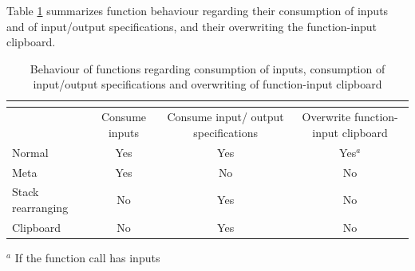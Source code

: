 \documentclass[12pt]{article}
\newcommand{\esptab}{\multicolumn{1}{c}{} \\[-.3cm]} %
\begin{document}
Table \ref{tab: function consumption} summarizes function behaviour regarding their consumption of inputs and of input/output specifications, and their overwriting the function-input clipboard.
\begin{table}
\centering
\caption{Behaviour of functions regarding consumption of inputs, consumption of input/output specifications and overwriting of function-input clipboard}
\label{tab: function consumption}
\begin{tabular}{|l|c|c|c|}
\esptab
\hline
\multicolumn{1}{|p{3cm}}{ } & \multicolumn{1}{|p{3cm}}{Consume inputs} & \multicolumn{1}{|p{3cm}|}{Consume input/ output specifications} & \multicolumn{1}{|p{3cm}|}{Overwrite function-input clipboard} \\ \hline\hline
Normal & Yes & Yes & Yes$^a$ \\ \hline
Meta & Yes & No & No\\ \hline
Stack rearranging & No & Yes & No \\ \hline
Clipboard & No & Yes & No \\ \hline
\end{tabular}
\vspace{-2mm}
\flushleft
\footnotesize{$^a$ If the function call has inputs}
\end{table}
\end{document}

